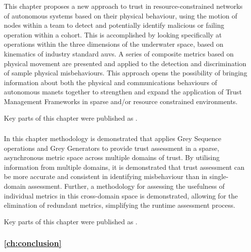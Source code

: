 This chapter proposes a new approach to trust in resource-constrained networks of autonomous systems based on their physical behaviour, using the motion of nodes within a team to detect and potentially identify malicious or failing operation within a cohort.
This is accomplished by looking specifically at operations within the three dimensions of the underwater space, based on kinematics of industry standard \glspl{auv}.
A series of composite metrics based on physical movement are presented and applied to the detection and discrimination of sample physical misbehaviours.
This approach opens the possibility of bringing information about both the physical and communications behaviours of autonomous \glspl{manet} together to strengthen and expand the application of Trust Management Frameworks in sparse and/or resource constrained environments.

Key parts of this chapter were published as .



\subsubsection{}

In this chapter methodology is demonstrated that applies Grey Sequence operations and Grey Generators to provide trust assessment in a sparse, asynchronous metric space across multiple domains of trust.
By utilising information from multiple domains, it is demonstrated that trust assessment can be more accurate and consistent in identifying misbehaviour than in single-domain assessment.
Further, a methodology for assessing the usefulness of individual metrics in this cross-domain space is demonstrated, allowing for the elimination of redundant metrics, simplifying the runtime assessment process.

Key parts of this chapter were published as .

\subsubsection{\autoref{ch:conclusion}}





